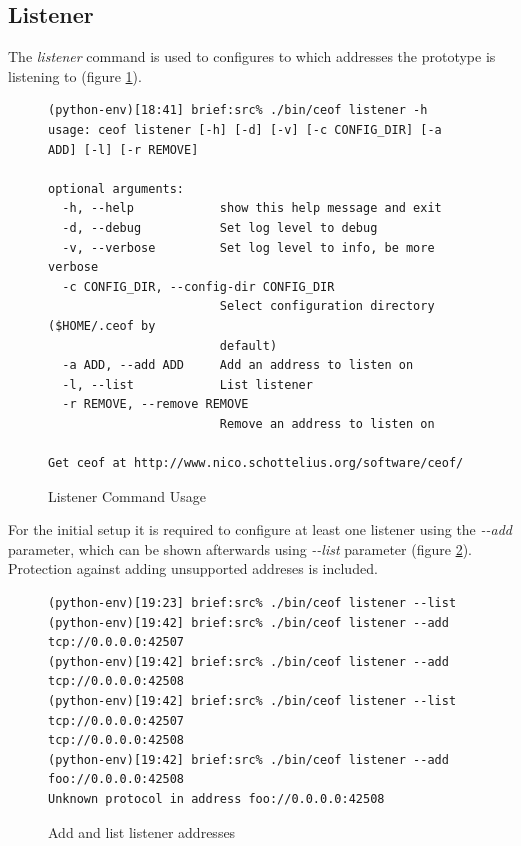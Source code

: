 \subsection{Listener}
The \textit{listener} command is used
to configures to which addresses the prototype is listening to (figure
\ref{listenerusage}).
\begin{figure}
\caption{Listener Command Usage}
\label{listenerusage}
\begin{verbatim}
(python-env)[18:41] brief:src% ./bin/ceof listener -h
usage: ceof listener [-h] [-d] [-v] [-c CONFIG_DIR] [-a ADD] [-l] [-r REMOVE]

optional arguments:
  -h, --help            show this help message and exit
  -d, --debug           Set log level to debug
  -v, --verbose         Set log level to info, be more verbose
  -c CONFIG_DIR, --config-dir CONFIG_DIR
                        Select configuration directory ($HOME/.ceof by
                        default)
  -a ADD, --add ADD     Add an address to listen on
  -l, --list            List listener
  -r REMOVE, --remove REMOVE
                        Remove an address to listen on

Get ceof at http://www.nico.schottelius.org/software/ceof/
\end{verbatim}
\end{figure}
For the initial setup it is required to configure at least one listener
using the \textit{-{}-add} parameter, which can be shown afterwards using
\textit{-{}-list} parameter (figure \ref{addandlistlistener}). 
Protection against adding unsupported addreses is included.
\begin{figure}[htb]
\caption{Add and list listener addresses}
\label{addandlistlistener}
\begin{verbatim}
(python-env)[19:23] brief:src% ./bin/ceof listener --list
(python-env)[19:42] brief:src% ./bin/ceof listener --add tcp://0.0.0.0:42507
(python-env)[19:42] brief:src% ./bin/ceof listener --add tcp://0.0.0.0:42508
(python-env)[19:42] brief:src% ./bin/ceof listener --list                   
tcp://0.0.0.0:42507
tcp://0.0.0.0:42508
(python-env)[19:42] brief:src% ./bin/ceof listener --add foo://0.0.0.0:42508 
Unknown protocol in address foo://0.0.0.0:42508
\end{verbatim}
\end{figure}
